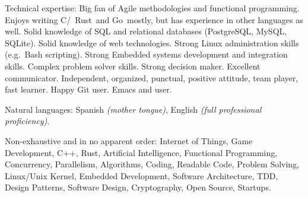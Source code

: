 \documentclass[10pt,a4paper]{article}
\begin{document}
\spacedhrule{0.5em}{-0.4em}


\inlineheadsection  %
  {Technical expertise:}
  {Big fan of Agile methodologies and functional programming. Enjoys writing C/\nsp\CPP\nsp\, Rust\nsp\ and Go\nsp\ mostly, but has experience in other languages as well. Solid knowledge of SQL and relational databases (PostgreSQL, MySQL, SQLite). Solid knowledge of web technologies. Strong Linux administration skills (e.g.\ Bash scripting). Strong Embedded systems development and integration skills. Complex problem solver skills. Strong decision maker. Excellent communicator. Independent, organized, punctual, positive attitude, team player, fast learner. Happy Git user. Emacs and  user.}

\vspace{0.5em}
\inlineheadsection
  {Natural languages:}
  {Spanish \emph{(mother tongue)}, English \emph{(full professional proficiency)}.}

\spacedhrule{1.6em}{-0.4em}


\inlineheadsection
  {Non-exhaustive and in no apparent order:}
  {Internet of Things, Game Development, C++, Rust, Artificial Intelligence, Functional Programming, Concurrency, Parallelism, Algorithms, Coding, Readable Code, Problem Solving, Linux/Unix Kernel, Embedded Development, Software Architecture, TDD, Design Patterns, Software Design, Cryptography, Open Source, Startups.}
\end{document}
